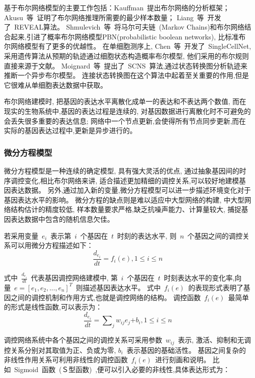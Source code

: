 基于布尔网络模型的主要工作包括：Kauffman~\cite{kauffman2003random}提出布尔网络的分析框架；
Akusu~等~\cite{akutsu1999identification}证明了布尔网络推理所需要的最少样本数量；
Liang~等~\cite{liang1998reveal}开发了~REVEAL算法。
Shmulevich~等~\cite{marshall2007inference}将马尔可夫链~(Markov Chains)和布尔网络结合起来,引进了概率布尔网络模型PBN(probabilistic boolean networks),
比标准布尔网络模型有了更多的优越性。
在单细胞测序上,
Chen~等~\cite{chen2014single}开发了~SingleCellNet,
采用遗传算法从预期的轨迹通过细胞状态构造概率布尔模型, 他们采用的布尔规则直接来源于文献。
Moignard~等~\cite{moignard2015decoding}提出了~SCNS~算法,通过状态转换图分析轨迹来推断一个异步布尔模型。
连接状态转换图在这个算法中起着至关重要的作用,但是它很难从单细胞表达数据中获取。

布尔网络建模时, 把基因的表达水平离散化成单一的表达和不表达两个数值,
而在现实的生物系统中,基因的表达过程是连续的,
对基因数据进行离散化时不可避免的会丢失很多重要的表达信息;
网络中一个节点更新,会使得所有节点同步更新,而在实际的基因表达过程中,更新是异步进行的。

\subsubsection{微分方程模型}
微分方程模型是一种连续的确定模型, 具有强大灵活的优点,
通过抽象基因间的时序调控变化,相比布尔网络来讲, 适合描述更加精细的调控关系,可以较好地建模基因表达数据。
另外,通过加入新的变量,微分方程模型可以进一步描述环境变化对于基因表达水平的影响。
微分方程的缺点则是难以适应中大型网络的构建, 中大型网络结构估计的精度较低,
样本数量要求严格,缺乏抗噪声能力、计算量较大, 捕捉基因表达数据中包含的随机信息欠佳。

若采用变量~$e_i$~表示第~$i$~个基因在~$t$~时刻的表达水平, 则~$n$~个基因之间的调控关系可以用微分方程描述如下：
\begin{equation}
\frac{{d_{e_i}}}{{dt}} = f_i (e),1 \le i \le n
\end{equation}

式中~$\frac{{d_{e_i }}}{{dt}}$~代表基因调控网络建模中,
第~$i$~个基因在~$t$~时刻表达水平的变化率,向量~$e=[e_1,e_2,...,e_n]^T$~则描述基因表达水平。
式中~$f_i(e)$~的表现形式表明了基因之间的调控机制和作用方式,也就是调控网络的结构。
调控函数~$f_i(e)$~最简单的形式是线性函数,可以表示为：
\begin{equation}
\frac{{d_{e_i }}}{{dt}} = \sum\nolimits_j {w_{ij} e_j} { + b_i } ,1 \le i \le n
\end{equation}

调控网络系统中各个基因之间的调控关系可采用参数~$w_{ij}$~表示,
激活、抑制和无调控关系分别对其取值为正、负或为零, $b_i$~表示基因的基础活性。
基因之间复杂的非线性作用关系可利用非线性的调控函数~$f_i(e)$~进行刻画和说明。
比如~Sigmoid~函数~(Ｓ型函数)~,便可以引入必要的非线性,具体表达形式为：

